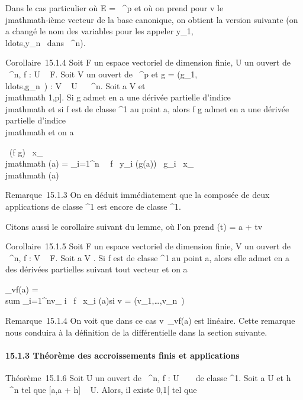 \documentclass[]{article}
\begin{document}
Dans le cas particulier où E = ~^p et où on prend pour v le
\\jmathmath-ième vecteur de la base canonique, on obtient la version suivante (on
a changé le nom des variables pour les appeler
y_1,\\ldots,y_n~
dans ~^n).

Corollaire~15.1.4 Soit F un espace vectoriel de dimension finie, U un
ouvert de ~^n, f : U \rightarrow~ F. Soit V un ouvert de ~^p
et g =
(g_1,\\ldots,g_n~)
: V \rightarrow~ U \subset~ ~^n. Soit a \in V et \\jmathmath \in {[}1,p{]}. Si g admet en a
une dérivée partielle d'indice \\jmathmath et si f est de classe ^1 au
point a, alors f \cdot g admet en a une dérivée partielle d'indice \\jmathmath et on a

 \partial~(f \cdot g) \over \partial~x_\\jmathmath (a) =
\sum _i=1^n~ \partial~f
\over \partial~y_i (g(a)) \partial~g_i
\over \partial~x_\\jmathmath (a)

Remarque~15.1.3 On en déduit immédiatement que la composée de deux
applications de classe ^1 est encore de classe
^1.

Citons aussi le corollaire suivant du lemme, où l'on prend \phi(t) = a + tv

Corollaire~15.1.5 Soit F un espace vectoriel de dimension finie, V un
ouvert de ~^n, f : V \rightarrow~ F. Soit a \in V . Si f est de classe
^1 au point a, alors elle admet en a des dérivées partielles
suivant tout vecteur et on a

\partial_vf(a) = \\sum
_i=1^nv_ i \partial~f \over
\partial~x_i (a)\qquad \text si v =
(v_1,\ldots,v_n~)

Remarque~15.1.4 On voit que dans ce cas
v\mapsto~\partial_vf(a) est linéaire. Cette
remarque nous conduira à la définition de la différentielle dans la
section suivante.

\paragraph{15.1.3 Théorème des accroissements finis et applications}

Théorème~15.1.6 Soit U un ouvert de ~^n, f : U \rightarrow~ ~ de classe
^1. Soit a \in U et h \in {}~^n tel que {[}a,a + h{]} \subset~
U. Alors, il existe \theta \in{]}0,1{[} tel que
\end{document}
